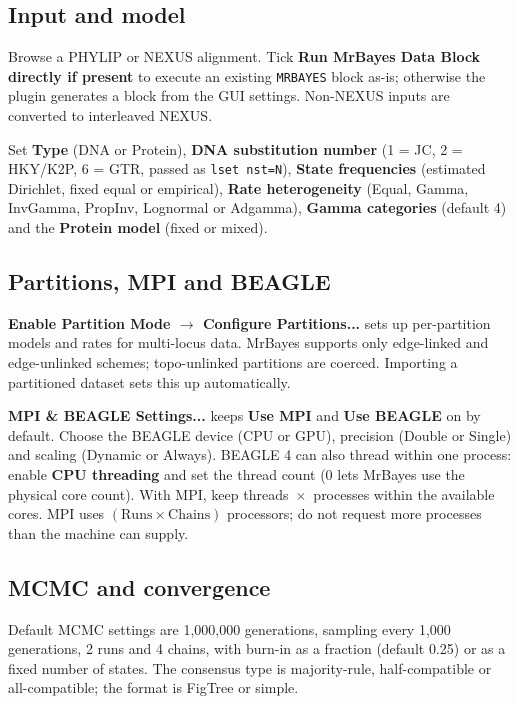 \documentclass[10pt]{report}
\begin{document}
\subsection{Input and model}

Browse a PHYLIP or NEXUS alignment. Tick \textbf{Run MrBayes Data Block
directly if present} to execute an existing \texttt{MRBAYES} block as-is;
otherwise the plugin generates a block from the GUI settings. Non-NEXUS inputs
are converted to interleaved NEXUS.

Set \textbf{Type} (DNA or Protein), \textbf{DNA substitution number} (1 = JC,
2 = HKY/K2P, 6 = GTR, passed as \texttt{lset nst=N}), \textbf{State
frequencies} (estimated Dirichlet, fixed equal or empirical), \textbf{Rate
heterogeneity} (Equal, Gamma, InvGamma, PropInv, Lognormal or Adgamma),
\textbf{Gamma categories} (default 4) and the \textbf{Protein model} (fixed or
mixed).

\subsection{Partitions, MPI and BEAGLE}

\textbf{Enable Partition Mode $\rightarrow$ Configure Partitions...} sets up
per-partition models and rates for multi-locus data. MrBayes supports only
edge-linked and edge-unlinked schemes; topo-unlinked partitions are coerced.
Importing a partitioned dataset sets this up automatically.

\textbf{MPI \& BEAGLE Settings...} keeps \textbf{Use MPI} and \textbf{Use
BEAGLE} on by default. Choose the BEAGLE device (CPU or GPU), precision
(Double or Single) and scaling (Dynamic or Always). BEAGLE 4 can also thread
within one process: enable \textbf{CPU threading} and set the thread count
(0 lets MrBayes use the physical core count). With MPI, keep
threads~$\times$~processes within the available cores. MPI uses
$(\mathrm{Runs} \times \mathrm{Chains})$ processors; do not request more
processes than the machine can supply.

\subsection{MCMC and convergence}

Default MCMC settings are 1{,}000{,}000 generations, sampling every 1{,}000
generations, 2 runs and 4 chains, with burn-in as a fraction (default 0.25) or
as a fixed number of states. The consensus type is majority-rule,
half-compatible or all-compatible; the format is FigTree or simple.
\end{document}
